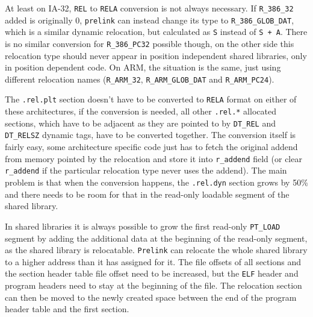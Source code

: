 \documentclass[twoside]{article}
\def\tts#1{\texttt{\small #1}}
\begin{document}
At least on IA-32, \tts{REL} to \tts{RELA} conversion is not always
necessary.  If \tts{R\_386\_32} added is originally 0, \tts{prelink}
can instead change its type to \tts{R\_386\_GLOB\_DAT}, which is a
similar dynamic relocation, but calculated as \tts{S} instead of
\tts{S~+~A}.  There is no similar conversion for \tts{R\_386\_PC32}
possible though, on the other side this relocation type should never
appear in position independent shared libraries, only in position
dependent code.  On ARM, the situation is the same, just using
different relocation names (\tts{R\_ARM\_32}, \tts{R\_ARM\_GLOB\_DAT}
and \tts{R\_ARM\_PC24}).

The \tts{.rel.plt} section doesn't have to be converted to \tts{RELA}
format on either of these architectures, if the conversion is needed,
all other \tts{.rel.*} allocated sections, which have to be adjacent
as they are pointed to by \tts{DT\_REL} and \tts{DT\_RELSZ} dynamic tags,
have to be converted together.  The conversion itself is fairly easy,
some architecture specific code just has to fetch the original addend
from memory pointed by the relocation and store it into \tts{r\_addend}
field (or clear \tts{r\_addend} if the particular relocation type
never uses the addend).  The main problem is that when the conversion
happens, the \tts{.rel.dyn} section grows by 50\% and there needs to be
room for that in the read-only loadable segment of the shared library.

In shared libraries it is always possible to grow the first read-only
\tts{PT\_LOAD} segment by adding the additional data at the beginning
of the read-only segment, as the shared library is relocatable.
\tts{Prelink} can relocate the whole shared library to a higher address
than it has assigned for it.  The file offsets of all sections
and the section header table file offset need to be increased,
but the \tts{ELF} header and program headers need to stay at the beginning
of the file.  The relocation section can then be moved to the newly created
space between the end of the program header table and the first section.
\end{document}
